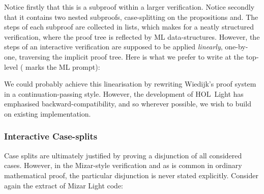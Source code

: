 Notice firstly that this is a subproof within a larger verification. Notice secondly that it contains two nested subproofs, case-splitting on the propositions  and\linebreak {}. The steps of each subproof are collected in lists, which makes for a neatly structured verification, where the proof tree is reflected by ML data-structures. However, the steps of an interactive verification are supposed to be applied \emph{linearly}, one-by-one, traversing the implicit proof tree. Here is what we prefer to write at the top-level (\code{>} marks the ML prompt):

\vspace{0.5cm}
\begin{minipage}{\linewidth}
  \footnotesize







\end{minipage}
\vspace{0.5cm}

We could probably achieve this linearisation by rewriting Wiedijk's proof system in a continuation-passing style. However, the development of HOL~Light has emphasised backward-compatibility, and so wherever possible, we wish to build on existing implementation.

\subsubsection{Interactive Case-splits}
Case splits are ultimately justified by proving a disjunction of all considered cases. However, in the Mizar-style verification and as is common in ordinary mathematical proof, the particular disjunction is never stated explicitly. Consider again the extract of Mizar Light code:

\vspace{0.5cm}
\begin{minipage}{\linewidth}
  \footnotesize

  \code{\quad\enspace[[suppose "p1 = p2";}

  \code{\qquad\enspace qed from [0] by [LEMMA1]];}

  \code{\qquad [suppose "$\neg$(p1 = p2)";}

  \code{\qquad\enspace qed from [1]]]];}
\end{minipage}
\vspace{0.5cm}


